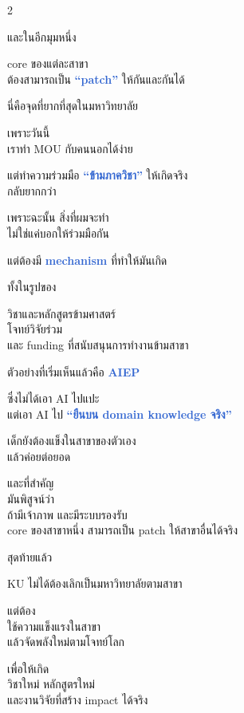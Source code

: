 \documentclass[10pt]{article}
\begin{document}
\begin{tcolorbox}[breakable,colback=panel,colframe=line,boxrule=0.5pt,arc=2mm,left=3mm,right=3mm,top=2mm,bottom=2mm]
\begin{multicols}{2}
\par และในอีกมุมหนึ่ง
\par core ของแต่ละสาขา\\ ต้องสามารถเป็น \textbf{\textcolor{highlight}{“patch”}} ให้กันและกันได้
\par นี่คือจุดที่ยากที่สุดในมหาวิทยาลัย
\par เพราะวันนี้\\ เราทำ MOU กับคนนอกได้ง่าย
\par แต่ทำความร่วมมือ \textbf{\textcolor{highlight}{“ข้ามภาควิชา”}} ให้เกิดจริง\\ กลับยากกว่า
\par เพราะฉะนั้น สิ่งที่ผมจะทำ\\ ไม่ใช่แค่บอกให้ร่วมมือกัน
\par แต่ต้องมี \textbf{\textcolor{highlight}{mechanism}} ที่ทำให้มันเกิด
\par ทั้งในรูปของ
\par วิชาและหลักสูตรข้ามศาสตร์\\ โจทย์วิจัยร่วม\\ และ funding ที่สนับสนุนการทำงานข้ามสาขา
\par ตัวอย่างที่เริ่มเห็นแล้วคือ \textbf{\textcolor{highlight}{AIEP}}
\par ซึ่งไม่ได้เอา AI ไปแปะ\\ แต่เอา AI ไป \textbf{\textcolor{highlight}{“ยืนบน domain knowledge จริง”}}
\par เด็กยังต้องแข็งในสาขาของตัวเอง\\ แล้วค่อยต่อยอด
\par และที่สำคัญ\\ มันพิสูจน์ว่า\\ ถ้ามีเจ้าภาพ และมีระบบรองรับ\\ core ของสาขาหนึ่ง สามารถเป็น patch ให้สาขาอื่นได้จริง
\par สุดท้ายแล้ว
\par KU ไม่ได้ต้องเลิกเป็นมหาวิทยาลัยตามสาขา
\par แต่ต้อง\\ ใช้ความแข็งแรงในสาขา\\ แล้วจัดพลังใหม่ตามโจทย์โลก
\par เพื่อให้เกิด\\ วิชาใหม่ หลักสูตรใหม่\\ และงานวิจัยที่สร้าง impact ได้จริง
\end{multicols}
\end{tcolorbox}

\clearpage
\end{document}
